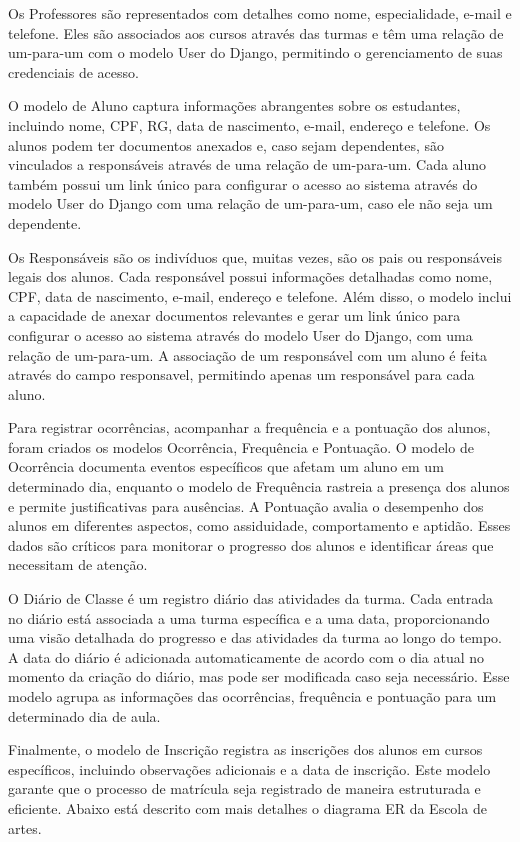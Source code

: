 Os Professores são representados com detalhes como nome, especialidade, e-mail e telefone. Eles são associados aos cursos através das turmas e têm uma relação de um-para-um com o modelo User do Django, permitindo o gerenciamento de suas credenciais de acesso.

O modelo de Aluno captura informações abrangentes sobre os estudantes, incluindo nome, CPF, RG, data de nascimento, e-mail, endereço e telefone. Os alunos podem ter documentos anexados e, caso sejam dependentes, são vinculados a responsáveis através de uma relação de um-para-um. Cada aluno também possui um link único para configurar o acesso ao sistema através do modelo User do Django com uma relação de um-para-um, caso ele não seja um dependente.

Os Responsáveis são os indivíduos que, muitas vezes, são os pais ou responsáveis legais dos alunos. Cada responsável possui informações detalhadas como nome, CPF, data de nascimento, e-mail, endereço e telefone. Além disso, o modelo inclui a capacidade de anexar documentos relevantes e gerar um link único para configurar o acesso ao sistema através do modelo User do Django, com uma relação de um-para-um. A associação de um responsável com um aluno é feita através do campo responsavel, permitindo apenas um responsável para cada aluno.

Para registrar ocorrências, acompanhar a frequência e a pontuação dos alunos, foram criados os modelos Ocorrência, Frequência e Pontuação. O modelo de Ocorrência documenta eventos específicos que afetam um aluno em um determinado dia, enquanto o modelo de Frequência rastreia a presença dos alunos e permite justificativas para ausências. A Pontuação avalia o desempenho dos alunos em diferentes aspectos, como assiduidade, comportamento e aptidão. Esses dados são críticos para monitorar o progresso dos alunos e identificar áreas que necessitam de atenção.

O Diário de Classe é um registro diário das atividades da turma. Cada entrada no diário está associada a uma turma específica e a uma data, proporcionando uma visão detalhada do progresso e das atividades da turma ao longo do tempo. A data do diário é adicionada automaticamente de acordo com o dia atual no momento da criação do diário, mas pode ser modificada caso seja necessário. Esse modelo agrupa as informações das ocorrências, frequência e pontuação para um determinado dia de aula.

Finalmente, o modelo de Inscrição registra as inscrições dos alunos em cursos específicos, incluindo observações adicionais e a data de inscrição. Este modelo garante que o processo de matrícula seja registrado de maneira estruturada e eficiente. Abaixo está descrito com mais detalhes o diagrama ER da Escola de artes.

